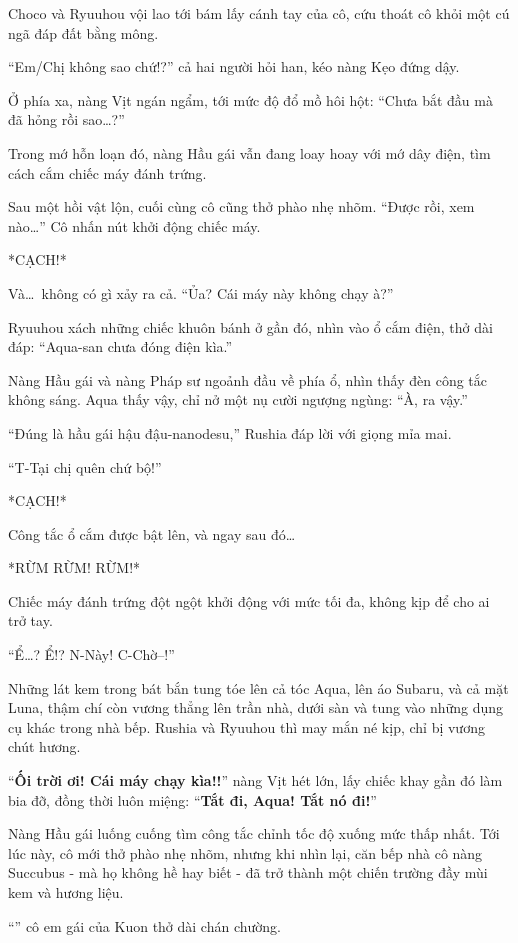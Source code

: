 \documentclass[../main.tex]{subfiles}
\begin{document}
Choco và Ryuuhou vội lao tới bám lấy cánh tay của cô, cứu thoát cô khỏi một cú ngã đáp đất bằng mông.

``Em/Chị không sao chứ!?'' cả hai người hỏi han, kéo nàng Kẹo đứng dậy.

Ở phía xa, nàng Vịt ngán ngẩm, tới mức độ đổ mồ hôi hột: ``Chưa bắt đầu mà đã hỏng rồi sao\dots?''

Trong mớ hỗn loạn đó, nàng Hầu gái vẫn đang loay hoay với mớ dây điện, tìm cách cắm chiếc máy đánh trứng.

Sau một hồi vật lộn, cuối cùng cô cũng thở phào nhẹ nhõm. ``Được rồi, xem nào\dots'' Cô nhấn nút khởi động chiếc máy.

*CẠCH!*

Và\dots\ không có gì xảy ra cả. ``Ủa? Cái máy này không chạy à?''

Ryuuhou xách những chiếc khuôn bánh ở gần đó, nhìn vào ổ cắm điện, thở dài đáp: ``Aqua-san chưa đóng điện kìa.''

Nàng Hầu gái và nàng Pháp sư ngoảnh đầu về phía ổ, nhìn thấy đèn công tắc không sáng. Aqua thấy vậy, chỉ nở một nụ cười ngượng ngùng: ``À, ra vậy.''

``Đúng là hầu gái hậu đậu-nanodesu,'' Rushia đáp lời với giọng mỉa mai.

``T-Tại chị quên chứ bộ!''

*CẠCH!*

Công tắc ổ cắm được bật lên, và ngay sau đó\dots

*RỪM RỪM! RỪM!*

Chiếc máy đánh trứng đột ngột khởi động với mức tối đa, không kịp để cho ai trở tay.

``Ể\dots? Ể!? N-Này! C-Chờ--!''

Những lát kem trong bát bắn tung tóe lên cả tóc Aqua, lên áo Subaru, và cả mặt Luna, thậm chí còn vương thẳng lên trần nhà, dưới sàn và tung vào những dụng cụ khác trong nhà bếp. Rushia và Ryuuhou thì may mắn né kịp, chỉ bị vương chút hương.

``\textbf{Ối trời ơi! Cái máy chạy kìa!!}'' nàng Vịt hét lớn, lấy chiếc khay gần đó làm bia đỡ, đồng thời luôn miệng: ``\textbf{Tắt đi, Aqua! Tắt nó đi!}''

Nàng Hầu gái luống cuống tìm công tắc chỉnh tốc độ xuống mức thấp nhất. Tới lúc này, cô mới thở phào nhẹ nhõm, nhưng khi nhìn lại, căn bếp nhà cô nàng Succubus - mà họ không hề hay biết - đã trở thành một chiến trường đầy mùi kem và hương liệu.

``'' cô em gái của Kuon thở dài chán chường.
\end{document}
